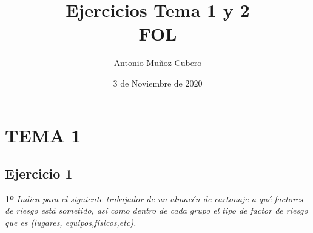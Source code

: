 \documentclass{article}
\title{Ejercicios Tema 1 y 2 \\ \textbf{FOL}}
\author{Antonio Muñoz Cubero}
\date{3 de Noviembre de 2020}
\begin{document}
  \maketitle
    \tableofcontents
        

  \newpage
    \section{TEMA 1}
      \subsection{Ejercicio 1}
        \textbf{1º} \textit{Indica para el siguiente trabajador de un almacén de cartonaje a qué factores de riesgo está sometido, así como dentro de cada grupo el tipo de factor de riesgo que es (lugares, equipos,físicos,etc).}
        \\
\end{document}
